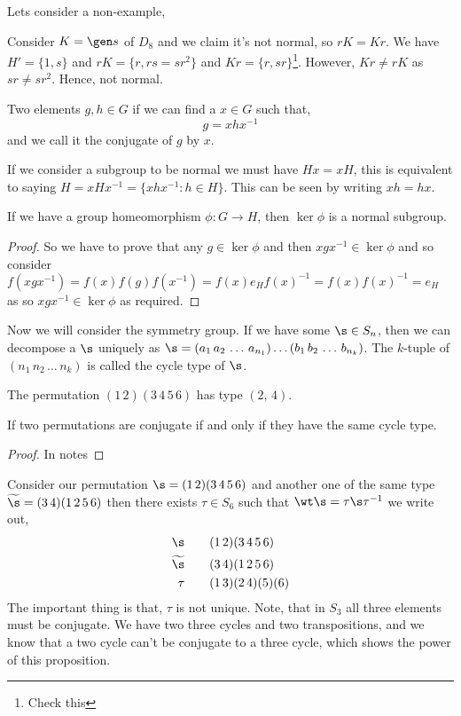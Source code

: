 Lets consider a non-example,
\begin{eg}
  Consider $K = \gen s$ of $D_8$ and we claim it's not normal, so $rK = Kr$. We have $H' = \{1, s\}$ and $rK = \{r, rs = sr^2\}$ and $Kr = \{r, sr\}$\footnote{Check this}. However, $Kr \ne rK$ as $sr \ne sr^2$. Hence, not normal.
\end{eg}

\begin{ndefi}[Conjugate]
  Two elements $g,h \in G$ if we can find a $x \in G$ such that,
  $$ g = x h x^{-1} $$
  and we call it the conjugate of $g$ by $x$.
\end{ndefi}
If we consider a subgroup to be normal we must have $Hx = xH$, this is equivalent to saying $H = xHx^{-1} = \{xhx^{-1} : h \in H\}$. This can be seen by writing $xh = hx$.

\begin{nlemma}
  If we have a group homeomorphism $\phi : G \to H$, then $\ker \phi$ is a normal subgroup.
\end{nlemma}
\begin{proof}
  So we have to prove that any $g \in \ker \phi$ and then $xgx^{-1} \in \ker\phi$ and so consider $f(xgx^{-1}) = f(x)f(g)f(x^{-1}) = f(x)e_{H}f(x)^{-1} = f(x)f(x)^{-1} = e_H$ as so $xgx^{-1} \in \ker\phi$ as required.
\end{proof}

Now we will consider the symmetry group. If we have some $\s \in S_n$, then we can decompose a $\s$ uniquely as $\s = (a_1\,a_2\,\dots\, a_{n_1})\dots (b_1\,b_2\,\dots\,b_{n_k})$. The $k$-tuple of $(n_1\, n_2\,\dots\, n_k)$ is called the cycle type of $\s$.

\begin{eg}
  The permutation $(1\,2)(3\,4\,5\,6)$ has type $(2,\,4)$.
\end{eg}

\begin{nprop}
  If two permutations are conjugate if and only if they have the same cycle type.
\end{nprop}
\begin{proof}
  In notes
\end{proof}

Consider our permutation $\s = (1\,2)(3\,4\,5\,6)$ and another one of the same type $\widetilde\s = (3\,4)(1\,2\,5\,6)$ then there exists $\tau \in S_6$ such that $\wt\s = \tau\s\tau^{-1}$ we write out,
\begin{align*}
  \s \qquad& (1\,2)(3\,4\,5\,6)\\
  \widetilde{\s} \qquad& (3\,4)(1\,2\,5\,6)\\
  \tau \qquad& (1\,3)(2\,4)(5)(6)
\end{align*}
The important thing is that, $\tau$ is not unique. Note, that in $S_3$ all three elements must be conjugate. We have two three cycles and two transpositions, and we know that a two cycle can't be conjugate to a three cycle, which shows the power of this proposition.\\

